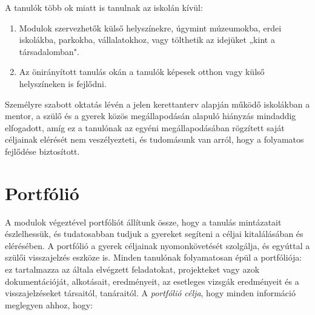 A tanulók több ok miatt is tanulnak az iskolán kívül:
\begin{enumerate}
\item Modulok szervezhetők külső helyszínekre, úgymint múzeumokba, erdei iskolákba, parkokba, vállalatokhoz, vagy tölthetik az idejüket „kint a társadalomban".

\item Az önirányított tanulás okán a tanulók képesek otthon vagy külső helyszíneken is fejlődni.
\end{enumerate}
Személyre szabott oktatás lévén a jelen kerettanterv alapján működő iskolákban a mentor, a szülő és a gyerek közös megállapodásán alapuló hiányzás mindaddig elfogadott, amíg ez a tanulónak az  egyéni megállapodásában rögzített saját céljainak elérését nem veszélyezteti, és tudomásunk van arról, hogy a folyamatos fejlődése biztosított.


\section{Portfólió}


A modulok végeztével portfóliót állítunk össze, hogy a tanulás mintázatait észlelhessük, és tudatosabban tudjuk a gyereket segíteni a céljai kitalálásában és elérésében. A portfólió a gyerek céljainak nyomonkövetését szolgálja, és egyúttal a szülői visszajelzés eszköze is. Minden tanulónak folyamatosan épül a portfóliója: ez tartalmazza az általa elvégzett feladatokat, projekteket vagy azok dokumentációját, alkotásait, eredményeit, az esetleges vizsgák eredményeit és a visszajelzéseket társaitól, tanáraitól. A \emph{portfólió célja}, hogy minden információ meglegyen ahhoz, hogy:

